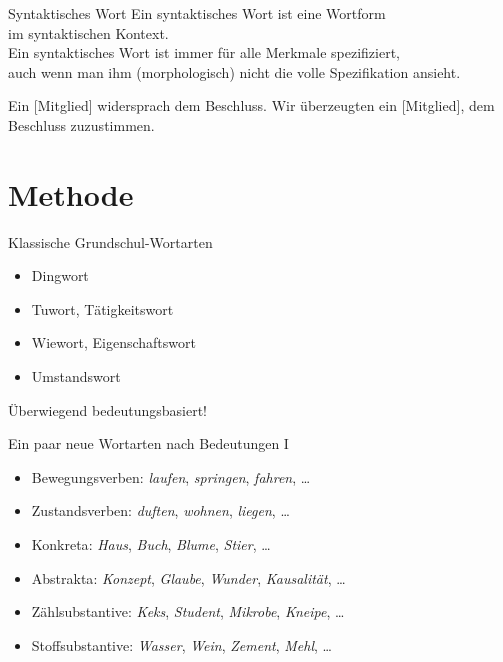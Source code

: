 \begin{frame}
  {Syntaktisches Wort}
  \onslide<+->
  \onslide<+->
  Ein \alert{syntaktisches Wort} ist eine \alert{Wortform}\\
  im syntaktischen Kontext.\\
  \Zeile
  \onslide<+->
  Ein syntaktisches Wort ist immer \alert{für alle Merkmale spezifiziert},\\
  auch wenn man ihm (morphologisch) nicht die volle Spezifikation ansieht.\\
  \Zeile
  \onslide<+->
  \begin{exe}
    \ex \alert{Ein [Mitglied]} widersprach dem Beschluss.
    \onslide<+->
    \ex Wir überzeugten \alert{ein [Mitglied]}, dem Beschluss zuzustimmen.
  \end{exe}
\end{frame}

\section{Methode}

\begin{frame}
  {Klassische Grundschul-Wortarten}
  \onslide<+->
    \begin{itemize}[<+->]
      \item Dingwort
      \item Tuwort, Tätigkeitswort
      \item Wiewort, Eigenschaftswort
      \item Umstandswort
    \end{itemize}
    \onslide<+->
    \Zeile
    Überwiegend \alert{bedeutungsbasiert}!
\end{frame}

\begin{frame}
  {Ein paar neue Wortarten nach Bedeutungen I}
  \pause
  \begin{itemize}[<+->]
    \item \alert{Bewegungsverben}: \textit{laufen}, \textit{springen}, \textit{fahren}, \dots
    \item \alert{Zustandsverben}: \textit{duften}, \textit{wohnen}, \textit{liegen}, \dots
      \Halbzeile
    \item \alert{Konkreta}: \textit{Haus}, \textit{Buch}, \textit{Blume}, \textit{Stier}, \dots
    \item \alert{Abstrakta}: \textit{Konzept}, \textit{Glaube}, \textit{Wunder}, \textit{Kausalität}, \dots
      \Halbzeile
    \item \alert{Zählsubstantive}: \textit{Keks}, \textit{Student}, \textit{Mikrobe}, \textit{Kneipe}, \dots
    \item \alert{Stoffsubstantive}: \textit{Wasser}, \textit{Wein}, \textit{Zement}, \textit{Mehl}, \dots
  \end{itemize}
\end{frame}

